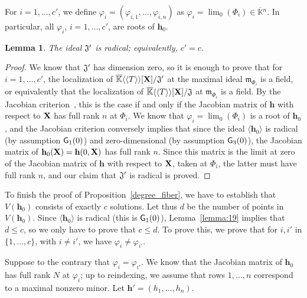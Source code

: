 \documentclass[11pt]{article}
\numberwithin{Property}{section}
\numberwithin{Theorem}{section}
\numberwithin{Proposition}{section}
\newtheorem{Lemma}{Lemma}%
\numberwithin{Lemma}{section}
\numberwithin{Corollary}{section}
\numberwithin{Definition}{section}
\numberwithin{Remark}{section}
\numberwithin{Conjecture}{section}
\numberwithin{Problem}{section}
\numberwithin{Claim}{section}
\theoremstyle{definition}
\numberwithin{Example}{section}
\def\h {\ensuremath{\mathbf{h}}}
\renewcommand{\le}{\leqslant}
\def\bar{\overline}
\renewcommand{\le}{\leqslant} %
\newcommand{\field}{\mathbb{K}} %
\newcommand{\mat}[1]{\mathbf{\MakeUppercase{#1}}} %
\begin{document}
For $i=1,\dots,c'$, we define $\varphi_i =
(\varphi_{i,1},\dots,\varphi_{i,n})$ as $\varphi_i=\lim_0(\Phi_i)\in
\bar{\field}{}^n$. In particular, all $\varphi_i$, $i=1,\dots,c'$, are roots
of $\h_0$.

\begin{Lemma}\label{lemma:Jprimerad}
  The ideal $\frak{J}'$ is radical; equivalently, $c'=c$.
\end{Lemma}

\begin{proof}
 We know that $\frak{J}'$ has dimension zero, so it is enough to prove
 that for $i=1,\dots,c'$, the localization of $\bar{\field}\langle\langle T
 \rangle\rangle[\mat{X}]/\frak{J}'$ at the maximal ideal
 $\mathfrak{m}_{\Phi_i}$ is a field, or equivalently that the
 localization of $\bar{\field}\langle\langle T \rangle\rangle[\mat{X}]/\frak{J}$
 at $\mathfrak{m}_{\Phi_i}$ is a field.  By the Jacobian
 criterion~\cite[Theorem~16.19.b]{Eisenbud95}, this is the case if and
 only if the Jacobian matrix of $\h$ with respect to $\mat{X}$ has full
 rank $n$ at $\Phi_i$. We know that $\varphi_i=\lim_0(\Phi_i)$ is a
 root of $\h_0$, and the Jacobian criterion conversely implies that
 since the ideal $\langle \h_0 \rangle$ is radical (by assumption
 ${\sf G}_1(0)$) and zero-dimensional (by assumption ${\sf G}_3(0)$),
 the Jacobian matrix of $\h_0(\mat{X})=\h(0,\mat{X})$ has full rank $n$. Since
 this matrix is the limit at zero of the Jacobian matrix of $\h$ with
 respect to $\mat{X}$, taken at $\Phi_i$, the latter must have full rank
 $n$, and our claim that $\frak{J}'$ is radical is proved.
\end{proof}

To finish the proof of Proposition~\ref{degree_fiber}, we have to
establish that $V(\h_0)$ consists of exactly $c$ solutions.  Let thus
$d$ be the number of points in $V(\h_0)$.  Since $\langle \h_0
\rangle$ is radical (this is ${\sf G}_1(0)$), Lemma~\ref{lemma:19}
implies that $d \le c$, so we only have to prove that $c \le d$. To
prove this, we prove that for $i,i'$ in $\{1,\dots,c\}$, with $i \ne
i'$, we have $\varphi_i \ne \varphi_{i'}$.

Suppose to the contrary that $\varphi_i = \varphi_{i'}$. We know that
the Jacobian matrix of $\h_0$ has full rank $N$ at $\varphi_i$; up to
reindexing, we assume that rows $1,\dots,n$ correspond to a maximal
nonzero minor. Let $\h'=(h_1,\dots,h_n)$.
\end{document}
